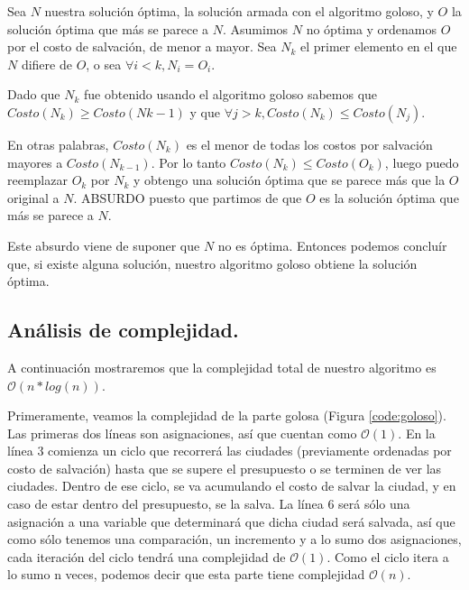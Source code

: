 Sea $N$ nuestra solución óptima, la solución armada con el algoritmo goloso, y $O$ la solución óptima que más se parece a $N$. Asumimos $N$ no óptima y ordenamos $O$ por el costo de salvación, de menor a mayor.
Sea $N_{k}$ el primer elemento en el que $N$ difiere de $O$, o sea $\forall i<k , N_{i}=O_{i}$.

Dado que $N_{k}$ fue obtenido usando el algoritmo goloso sabemos que $Costo(N_{k}) \geq Costo(N{k-1})$ y que $\forall j>k, Costo(N_{k}) \leq Costo(N_{j})$.

En otras palabras, $Costo(N_{k})$ es el menor de todas los costos por salvación mayores a $Costo(N_{k-1})$. Por lo tanto $Costo(N_{k}) \leq Costo(O_{k})$, luego puedo reemplazar $O_{k}$ por $N_{k}$ y obtengo una solución óptima que se parece más que la $O$ original a $N$. ABSURDO puesto que partimos de que $O$ es la solución óptima que más se parece a $N$.

Este absurdo viene de suponer que $N$ no es óptima.  Entonces podemos concluír que, si existe alguna solución, nuestro algoritmo goloso obtiene la solución óptima.

\vspace*{0.6cm}

\subsection{Análisis de complejidad.}

\vspace*{0.3cm}

A continuación mostraremos que la complejidad total de nuestro algoritmo es $\mathcal{O}(n*log(n))$.

Primeramente, veamos la complejidad de la parte golosa (Figura \ref{code:goloso}).  Las primeras dos líneas son asignaciones, así que cuentan como $\mathcal{O}(1)$. En la línea 3 comienza un ciclo que recorrerá las ciudades (previamente ordenadas por costo de salvación) hasta que se supere el presupuesto o se terminen de ver las ciudades. Dentro de ese ciclo, se va acumulando el costo de salvar la ciudad, y en caso de estar dentro del presupuesto, se la salva.  La línea 6 será sólo una asignación a una variable que determinará que dicha ciudad será salvada, así que como sólo tenemos una comparación, un incremento y a lo sumo dos asignaciones, cada iteración del ciclo tendrá una complejidad de $\mathcal{O}(1)$.  Como el ciclo itera a lo sumo n veces, podemos decir que esta parte tiene complejidad $\mathcal{O}(n)$.

